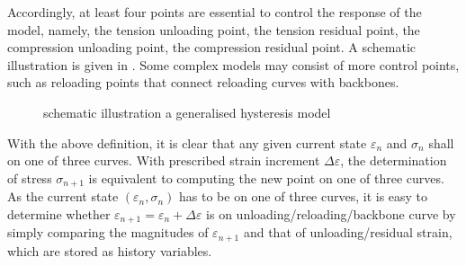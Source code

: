 Accordingly, at least four points are essential to control the response of the model, namely, the tension unloading point, the tension residual point, the compression unloading point, the compression residual point. A schematic illustration is given in . Some complex models may consist of more control points, such as reloading points that connect reloading curves with backbones.
\begin{figure}[ht]
\centering\footnotesize
{}
\caption{schematic illustration a generalised hysteresis model}\label{fig:general_hysteresis}
\end{figure}

With the above definition, it is clear that any given current state $\varepsilon_n$ and $\sigma_n$ shall on one of three curves. With prescribed strain increment $\Delta\varepsilon$, the determination of stress $\sigma_{n+1}$ is equivalent to computing the new point on one of three curves. As the current state $(\varepsilon_n,\sigma_n)$ has to be on one of three curves, it is easy to determine whether $\varepsilon_{n+1}=\varepsilon_n+\Delta\varepsilon$ is on unloading/reloading/backbone curve by simply comparing the magnitudes of $\varepsilon_{n+1}$ and that of unloading/residual strain, which are stored as history variables.

